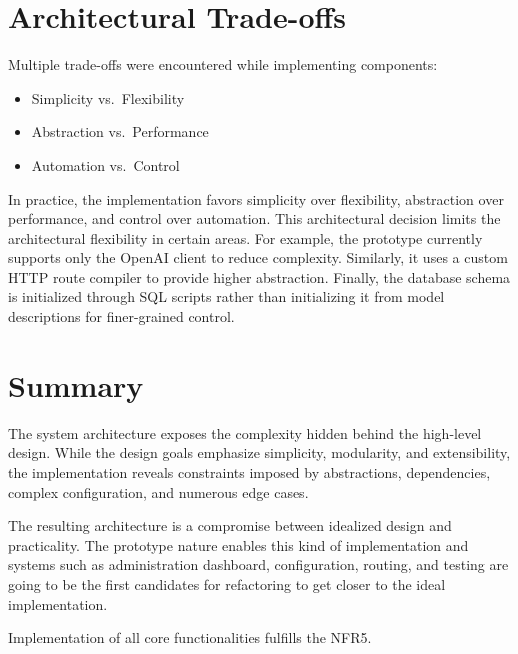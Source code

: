 \section{Architectural Trade-offs}\label{sec:architectural-tradeoffs}
Multiple trade-offs were encountered while implementing components:

\begin{itemize}
    \item Simplicity vs.\ Flexibility
    \item Abstraction vs.\ Performance
    \item Automation vs.\ Control
\end{itemize}

In practice, the implementation favors simplicity over flexibility, abstraction over performance, and control over automation.
This architectural decision limits the architectural flexibility in certain areas.
For example, the prototype currently supports only the OpenAI client to reduce complexity.
Similarly, it uses a custom HTTP route compiler to provide higher abstraction.
Finally, the database schema is initialized through SQL scripts rather than initializing it from model descriptions
for finer-grained control.

\section{Summary}\label{sec:architecture-summary}
The system architecture exposes the complexity hidden behind the high-level design.
While the design goals emphasize simplicity, modularity, and extensibility, the implementation reveals constraints
imposed by abstractions, dependencies, complex configuration, and numerous edge cases.

The resulting architecture is a compromise between idealized design and practicality.
The prototype nature enables this kind of implementation and systems such as administration dashboard, configuration, routing, and testing
are going to be the first candidates for refactoring to get closer to the ideal implementation.

Implementation of all core functionalities fulfills the NFR5.